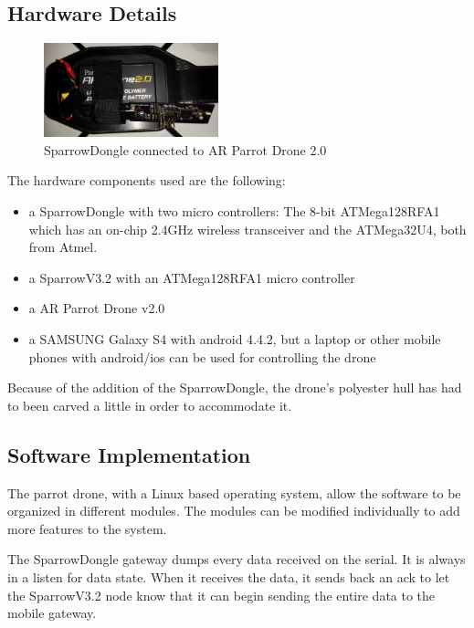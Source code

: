 \label{chap:impl}

 \subsection{Hardware Details}

\begin{figure}[hb] \centering
\includegraphics[width=0.45\textwidth]{img/dronedongle.jpg} \caption{SparrowDongle connected to AR Parrot Drone 2.0 } \end{figure}

The hardware components used are the following:
\begin{itemize}

\item a SparrowDongle with two micro controllers: The 8-bit ATMega128RFA1 which has an on-chip 2.4GHz wireless transceiver and the ATMega32U4, both from Atmel.

\item a SparrowV3.2  with an ATMega128RFA1 micro controller 

\item a AR Parrot Drone v2.0

\item a SAMSUNG Galaxy S4 with android 4.4.2, but a laptop or other mobile phones with android/ios can be used for controlling the drone

\end{itemize}

Because of the addition of the SparrowDongle, the drone's polyester hull has had to been carved a little in order to accommodate it.
 

\subsection{Software Implementation}

The parrot drone, with a Linux based operating system, allow the software to be organized in different modules. The modules can be modified individually  to add more features to the system.

The SparrowDongle gateway dumps every data received on the serial. It is always in a listen for data state. When it receives the data, it sends back an ack to let the SparrowV3.2 node know that it can begin sending the entire data to the mobile gateway. 

